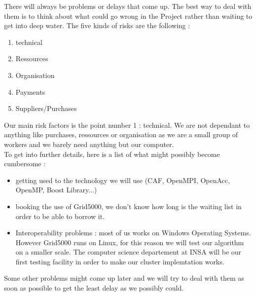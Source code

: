 There will always be problems or delays that come up. The best way to deal with them is to think about what could go wrong in the Project rather than waiting to get into deep water. The five kinds of risks are the following :
\begin{enumerate}
	\item technical
	\item Ressources
	\item Organisation
	\item Payments
	\item Suppliers/Purchases
\end{enumerate}
Our main risk factors is the point number 1 : technical. We are not dependant to anything like purchases, ressources or organisation as we are a small group of workers and we barely need anything but our computer.\\
To get into further details, here is a list of what might possibly become cumbersome :
\begin{itemize}
	\item getting used to the technology we will use (CAF, OpenMPI, OpenAcc, OpenMP, Boost Library...)
	\item booking the use of Grid5000, we don't know how long is the waiting list in order to be able to borrow it.
	\item Interoperability problems : most of us works on Windows Operating Systems. However Grid5000 runs on Linux, for this reason we will test our algorithm on a smaller scale. The computer science departement at INSA will be our first testing facility in order to make our cluster implemtation works.
\end{itemize}
Some other problems might come up later and we will try to deal with them as soon as possible to get the least delay as we possibly could.~\\
